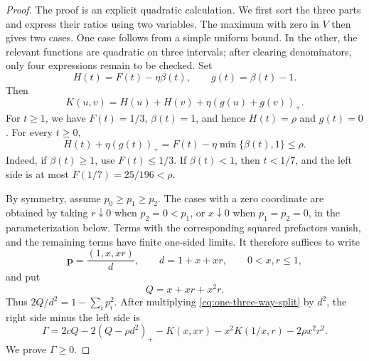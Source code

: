 \documentclass[10pt,a4paper]{amsart}
\begin{document}
\begin{proof}
The proof is an explicit quadratic calculation.  We first sort the three
parts and express their ratios using two variables.  The maximum with zero in $V$ then gives two cases.  One case follows from a simple uniform bound.  In
the other, the relevant functions are quadratic on three intervals; after
clearing denominators, only four expressions remain to be checked.
Set
\begin{equation}\label{eq:def-H-g}
 H(t)=F(t)-\eta\beta(t),
 \qquad
 g(t)=\beta(t)-1.
\end{equation}
Then
\begin{equation}\label{eq:K-Hg}
 K(u,v)=H(u)+H(v)+\eta(g(u)+g(v))_+.
\end{equation}
For $t\ge1$, we have $F(t)=1/3$, $\beta(t)=1$, and hence
$H(t)=\rho$ and $g(t)=0$.  For every $t\ge0$,
\begin{equation}\label{eq:single-rho}
 H(t)+\eta(g(t))_+
 =F(t)-\eta\min\{\beta(t),1\}\le\rho.
\end{equation}
Indeed, if $\beta(t)\ge1$, use $F(t)\le1/3$.  If $\beta(t)<1$, then
$t<1/7$, and the left side is at most
$F(1/7)=25/196<\rho$.

By symmetry, assume $p_0\ge p_1\ge p_2$.  The cases with a zero coordinate
are obtained by taking $r\downarrow0$ when $p_2=0<p_1$, or
$x\downarrow0$ when $p_1=p_2=0$, in the parameterization below.  Terms with
the corresponding squared prefactors vanish, and the remaining terms have
finite one-sided limits.  It therefore suffices to write
\begin{equation}\label{eq:param-p}
 \mathbf p=\frac{(1,x,xr)}d,
 \qquad d=1+x+xr,
 \qquad 0<x,r\le1,
\end{equation}
and put
\begin{equation}\label{eq:def-Q}
 Q=x+xr+x^2r.
\end{equation}
Thus $2Q/d^2=1-\sum_i p_i^2$.  After multiplying
\eqref{eq:one-three-way-split} by $d^2$, the right side minus the left side is
\begin{equation}\label{eq:def-Gamma}
 \Gamma=2cQ-2(Q-\rho d^2)_+
 -K(x,xr)-x^2K(1/x,r)-2\rho x^2r^2.
\end{equation}
We prove $\Gamma\ge0$.


\end{proof}
\end{document}
